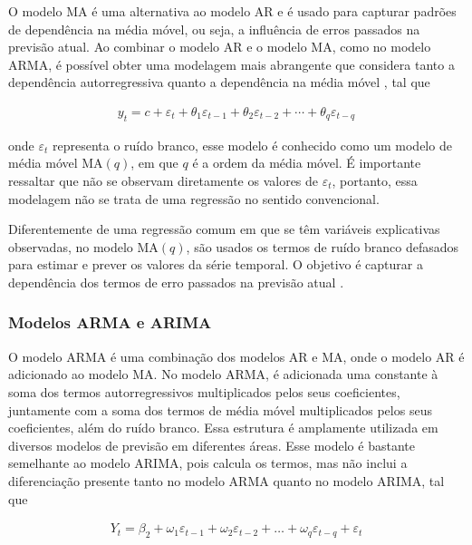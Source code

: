  O modelo MA é uma alternativa ao modelo AR e é usado para capturar padrões de dependência na média móvel, ou seja, a influência de erros passados na previsão atual. Ao combinar o modelo AR e o modelo MA, como no modelo ARMA, é possível obter uma modelagem mais abrangente que considera tanto a dependência autorregressiva quanto a dependência na média móvel \cite{arima}, tal que
 
 
 
 \begin{eqnarray}
 	y_t=c+\varepsilon_t+\theta_1 \varepsilon_{t-1}+\theta_2 \varepsilon_{t-2}+\cdots+\theta_q \varepsilon_{t-q}\label{eq:ma}
 \end{eqnarray}
 
 \noindent onde $\varepsilon_t$ representa o ruído branco, esse modelo é conhecido como um modelo de média móvel MA$(q)$, em que $q$ é a ordem da média móvel. É importante ressaltar que não se observam diretamente os valores de $\varepsilon_t$, portanto, essa modelagem não se trata de uma regressão no sentido convencional.
 
 Diferentemente de uma regressão comum em que se têm variáveis explicativas observadas, no modelo MA$(q)$, são usados os termos de ruído branco defasados para estimar e prever os valores da série temporal. O objetivo é capturar a dependência dos termos de erro passados na previsão atual \cite{arima}.
 
 
 
 \subsubsection{Modelos ARMA e ARIMA}\label{subsubsec:arma}
 
 O modelo ARMA é uma combinação dos modelos AR  e MA, onde o modelo AR é adicionado ao modelo MA.
 No modelo ARMA, é adicionada uma constante à soma dos termos autorregressivos multiplicados pelos seus coeficientes, juntamente com a soma dos termos de média móvel multiplicados pelos seus coeficientes, além do ruído branco. Essa estrutura é amplamente utilizada em diversos modelos de previsão em diferentes áreas.
 Esse modelo é bastante semelhante ao modelo ARIMA, pois calcula os termos, mas não inclui a diferenciação presente tanto no modelo ARMA quanto no modelo ARIMA, tal que
 
 \begin{eqnarray}
 	Y_t = \beta_2 + \omega_1\varepsilon_{t-1} + \omega_2 \varepsilon_{t-2} +\ldots+ \omega_q \varepsilon_{t-q} + \varepsilon_t \label{arima}
 \end{eqnarray}
 
